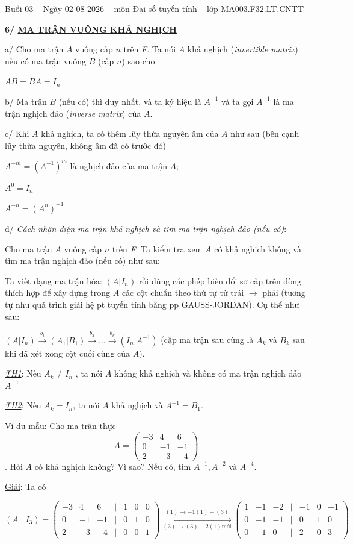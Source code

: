\documentclass[
]{article}
\author{}
\date{}
\let\ul\uline
\begin{document}
\ul{Buổi 03 -- Ngày 02-08-2026 -- môn Đại số tuyến tính -- lớp
MA003.F32.LT.CNTT}

\textbf{6/ \ul{MA TRẬN VUÔNG KHẢ NGHỊCH}}

a/ Cho ma trận $A$
vuông cấp $n$ trên
\emph{F}. Ta nói $A$
khả nghịch (\emph{invertible matrix}) nếu có ma trận vuông
$B$ (cấp
$n$) sao cho

$AB = BA = I_n$

b/ Ma trận $B$ (nếu
có) thì duy nhất, và ta ký hiệu là
$A^{-1}$ và ta gọi
$A^{-1}$ là ma trận
nghịch đảo (\emph{inverse matrix}) của
$A$.

c/ Khi $A$ khả
nghịch, ta có thêm lũy thừa nguyên âm của
$A$ như sau (bên
cạnh lũy thừa nguyên, không âm đã có trước đó)

$A^{-m} = (A^{-1})^m$ là nghịch đảo
của ma trận $A$;

$A^0 = I_n$

$A^{-n} = (A^n)^{-1}$

d/ \emph{\ul{Cách nhận diện ma trận khả nghịch và tìm ma trận nghịch đảo
(nếu có)}}:

Cho ma trận $A$
vuông cấp $n$ trên
\emph{F}. Ta kiểm tra xem
$A$ có khả nghịch
không và tìm ma trận nghịch đảo (nếu có) như sau:

Ta viết dạng ma trận hóa:
$(A|I_n)$ rồi dùng các
phép biến đổi sơ cấp trên dòng thích hợp để xây dựng trong
$A$ các cột chuẩn
theo thứ tự từ trái \textbf{$\rightarrow$} phải (tương tự như quá trình giải hệ pt
tuyến tính bằng pp GAUSS-JORDAN). Cụ thể như sau:

$(A|I_n) \xrightarrow{b_i} (A_1|B_1) \xrightarrow{b_2} \dots \xrightarrow{b_k} (I_n|A^{-1})$ (cặp ma trận
sau cùng là $A_k$ và
$B_k$ sau khi đã xét
xong cột cuối cùng của
$A$).

\emph{\ul{TH1}}: Nếu
$A_k \neq I_n$ , ta nói
$A$ không khả
nghịch và không có ma trận nghịch đảo
$A^{-1}$

\emph{\ul{TH2}}: Nếu
$A_k = I_n$, ta nói
$A$ khả nghịch và
$A^{-1} = B_1$.

\ul{Ví dụ mẫu}: Cho ma trận thực
$$A = \begin{pmatrix} -3 & 4 & 6 \\ 0 & -1 & -1 \\ 2 & -3 & -4 \end{pmatrix}$$. Hỏi
$A$ có khả nghịch
không? Vì sao? Nếu có, tìm
$A^{-1}, A^{-2}$ và
$A^{-4}$.

\ul{Giải}: Ta có

$$(A \mid I_3) = \begin{pmatrix} -3 & 4 & 6 & \mid & 1 & 0 & 0 \\ 0 & -1 & -1 & \mid & 0 & 1 & 0 \\ 2 & -3 & -4 & \mid & 0 & 0 & 1 \end{pmatrix} \xrightarrow[(3)\rightarrow(3)-2(1)\text{mới}]{(1)\rightarrow-1(1)-(3)} \begin{pmatrix} 1 & -1 & -2 & \mid & -1 & 0 & -1 \\ 0 & -1 & -1 & \mid & 0 & 1 & 0 \\ 0 & -1 & 0 & \mid & 2 & 0 & 3 \end{pmatrix}$$
\end{document}
